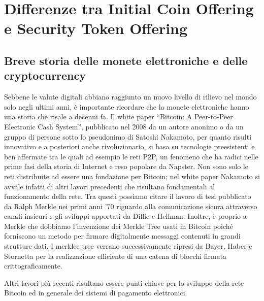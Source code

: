 \chapter{Differenze tra Initial Coin Offering e Security Token Offering}                %
\lhead[\fancyplain{}{\bfseries\thepage}]{\fancyplain{}{\bfseries\rightmark}}


\section{Breve storia delle monete elettroniche e delle cryptocurrency}

Sebbene le valute digitali abbiano raggiunto un nuovo livello di rilievo nel mondo solo negli ultimi anni, è importante ricordare che la monete elettroniche hanno una storia che risale a decenni fa. Il white paper “Bitcoin: A Peer-to-Peer Electronic Cash System”, pubblicato nel 2008 da un autore anonimo o da un gruppo di persone sotto lo pseudonimo di Satoshi Nakamoto, per quanto risulti innovativo e a posteriori anche rivoluzionario, si basa su tecnologie preesistenti e ben affermate tra le quali ad esempio le reti P2P, un fenomeno che ha radici nelle prime fasi della storia di Internet e reso popolare da Napster. Non sono solo le reti distribuite ad essere una fondazione per Bitcoin; nel white paper Nakamoto si avvale infatti di altri lavori precedenti che risultano fondamentali al funzionamento della rete. Tra questi possiamo citare il lavoro di tesi pubblicato da Ralph Merkle nei primi anni ’70  riguardo alla comunicazione sicura attraverso canali insicuri e gli sviluppi apportati da Diffie e Hellman. Inoltre, è proprio a Merkle che dobbiamo l’invenzione dei Merkle Tree usati in Bitcoin poiché forniscono un metodo per firmare digitalmente messaggi contenuti in grandi strutture dati. I merklee tree verrano successivamente ripresi da Bayer, Haber e Stornetta per la realizzazione efficiente di una catena di blocchi firmata crittograficamente.


Altri lavori più recenti risultano essere punti chiave per lo sviluppo della rete Bitcoin ed in generale dei sistemi di pagamento elettronici.


